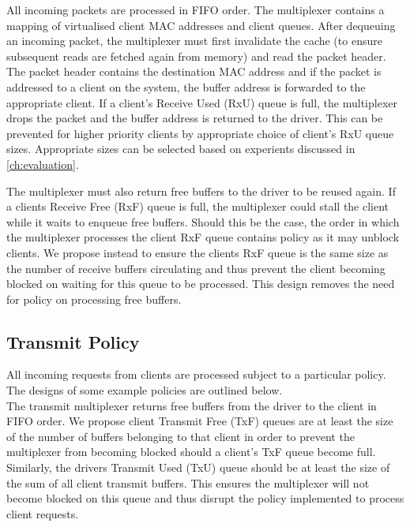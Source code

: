 All incoming packets are processed in FIFO order. The multiplexer contains a 
mapping of virtualised client MAC addresses and client queues. After dequeuing an incoming packet,
the multiplexer must first invalidate the cache (to ensure subsequent reads are fetched again from memory)
and read the packet header. The packet header contains the destination MAC address and if the packet is
addressed to a client on the system, the buffer address is forwarded to the appropriate client. 
If a client's Receive Used (RxU) queue is full, the multiplexer drops the packet and the buffer address is returned to
the driver. This can be prevented for higher priority clients by appropriate choice of client's RxU queue
sizes. Appropriate sizes can be selected based on experients discussed in \autoref{ch:evaluation}.

The multiplexer must also return free buffers to the driver to be reused again. If a clients Receive Free
(RxF) queue is full, the multiplexer could stall the client while it waits to enqueue free buffers. Should this be the case,
the order in which the multiplexer processes the client RxF queue contains policy as it may
unblock clients. We propose instead to ensure the clients RxF queue is the same size as the number
of receive buffers circulating and thus prevent the client becoming blocked on waiting for this queue to be
processed. This design removes the need for policy on processing free buffers. \\ 

\subsection{Transmit Policy}

All incoming requests from clients are processed subject to a particular policy. The designs of some
example policies are outlined below.\\
The transmit multiplexer returns free buffers from the driver to the client in FIFO order.
We propose client Transmit Free (TxF) queues are at least the size of the number of buffers
belonging to that client in order to prevent the multiplexer from becoming blocked 
should a client's TxF queue become full. \\ 
Similarly, the drivers Transmit Used (TxU) queue should be at least the size of the sum of 
all client transmit buffers. This ensures the multiplexer will not become blocked on this queue
and thus disrupt the policy implemented to process client requests. \\ 

